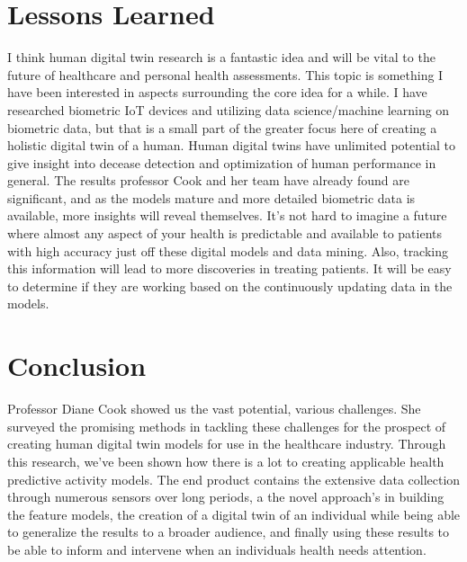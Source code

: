 \documentclass[journal,onecolumn]{IEEEtran}
\begin{document}
\section{Lessons Learned}

I think human digital twin research is a fantastic idea and will be vital to the future of healthcare and personal health assessments. This topic is something I have been interested in aspects surrounding the core idea for a while. I have researched biometric IoT devices and utilizing data science/machine learning on biometric data, but that is a small part of the greater focus here of creating a holistic digital twin of a human. Human digital twins have unlimited potential to give insight into decease detection and optimization of human performance in general. The results professor Cook and her team have already found are significant, and as the models mature and more detailed biometric data is available, more insights will reveal themselves. It's not hard to imagine a future where almost any aspect of your health is predictable and available to patients with high accuracy just off these digital models and data mining. Also, tracking this information will lead to more discoveries in treating patients. It will be easy to determine if they are working based on the continuously updating data in the models. 

\section{Conclusion}

Professor Diane Cook showed us the vast potential, various challenges. She surveyed the promising methods in tackling these challenges for the prospect of creating human digital twin models for use in the healthcare industry. Through this research, we've been shown how there is a lot to creating applicable health predictive activity models. The end product contains the extensive data collection through numerous sensors over long periods, a the novel approach's in building the feature models, the creation of a digital twin of an individual while being able to generalize the results to a broader audience, and finally using these results to be able to inform and intervene when an individuals health needs attention.

\end{document}
